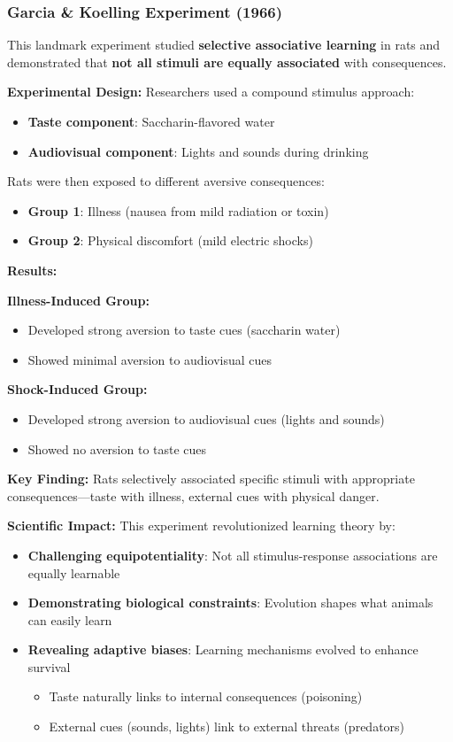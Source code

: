 \subsubsection{Garcia \& Koelling Experiment (1966)}
This landmark experiment studied \textbf{selective associative learning} in rats and demonstrated that \textbf{not all stimuli are equally associated} with consequences.

\textbf{Experimental Design:}
Researchers used a compound stimulus approach:
\begin{itemize}
    \item \textbf{Taste component}: Saccharin-flavored water
    \item \textbf{Audiovisual component}: Lights and sounds during drinking
\end{itemize}

Rats were then exposed to different aversive consequences:
\begin{itemize}
    \item \textbf{Group 1}: Illness (nausea from mild radiation or toxin)
    \item \textbf{Group 2}: Physical discomfort (mild electric shocks)
\end{itemize}

\textbf{Results:}

\textbf{Illness-Induced Group:}
\begin{itemize}
    \item Developed strong aversion to taste cues (saccharin water)
    \item Showed minimal aversion to audiovisual cues
\end{itemize}

\textbf{Shock-Induced Group:}
\begin{itemize}
    \item Developed strong aversion to audiovisual cues (lights and sounds)
    \item Showed no aversion to taste cues
\end{itemize}

\textbf{Key Finding:} Rats selectively associated specific stimuli with appropriate consequences---taste with illness, external cues with physical danger.

\textbf{Scientific Impact:}
This experiment revolutionized learning theory by:
\begin{itemize}
    \item \textbf{Challenging equipotentiality}: Not all stimulus-response associations are equally learnable
    \item \textbf{Demonstrating biological constraints}: Evolution shapes what animals can easily learn
    \item \textbf{Revealing adaptive biases}: Learning mechanisms evolved to enhance survival
    \begin{itemize}
        \item Taste naturally links to internal consequences (poisoning)
        \item External cues (sounds, lights) link to external threats (predators)
    \end{itemize}
\end{itemize}

